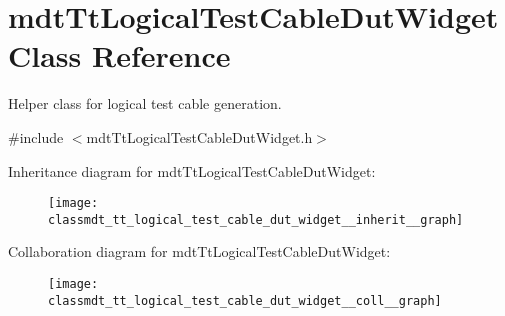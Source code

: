 \hypertarget{classmdt_tt_logical_test_cable_dut_widget}{\section{mdt\-Tt\-Logical\-Test\-Cable\-Dut\-Widget Class Reference}
\label{classmdt_tt_logical_test_cable_dut_widget}
}


Helper class for logical test cable generation.  




{\ttfamily \#include $<$mdt\-Tt\-Logical\-Test\-Cable\-Dut\-Widget.\-h$>$}



Inheritance diagram for mdt\-Tt\-Logical\-Test\-Cable\-Dut\-Widget\-:\nopagebreak
\begin{figure}[H]
\begin{center}
\leavevmode
\texttt{[image: classmdt\_tt\_logical\_test\_cable\_dut\_widget\_\_inherit\_\_graph]}
\end{center}
\end{figure}


Collaboration diagram for mdt\-Tt\-Logical\-Test\-Cable\-Dut\-Widget\-:\nopagebreak
\begin{figure}[H]
\begin{center}
\leavevmode
\texttt{[image: classmdt\_tt\_logical\_test\_cable\_dut\_widget\_\_coll\_\_graph]}
\end{center}
\end{figure}
